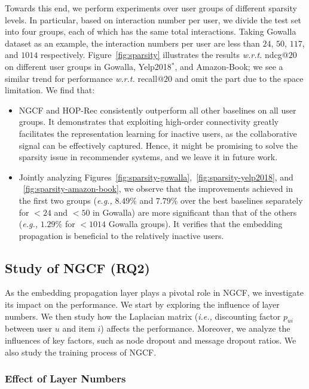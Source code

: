\documentclass[sigconf]{acmart}
\newcommand{\ie}{\emph{i.e., }}
\newcommand{\eg}{\emph{e.g., }}
\newcommand{\wrt}{\emph{w.r.t. }}
\theoremstyle{definition}
\begin{document}
Towards this end, we perform experiments over user groups of different sparsity levels.
In particular, based on interaction number per user, we divide the test set into four groups, each of which has the same total interactions.
Taking Gowalla dataset as an example, the interaction numbers per user are less than $24$, $50$, $117$, and $1014$ respectively.
Figure~\ref{fig:sparsity} illustrates the results \wrt ndcg@$20$ on different user groups in Gowalla, Yelp2018$^{*}$, and Amazon-Book; 
we see a similar trend for performance \wrt recall@$20$ and omit the part due to the space limitation.
We find that:
\begin{itemize}[leftmargin=*]
\item NGCF and HOP-Rec consistently outperform all other baselines on all user groups.
It demonstrates that exploiting high-order connectivity greatly facilitates the representation learning for inactive users, as the collaborative signal can be effectively captured.
Hence, it might be promising to solve the sparsity issue in recommender systems, and we leave it in future work.

\item Jointly analyzing Figures~\ref{fig:sparsity-gowalla},~\ref{fig:sparsity-yelp2018}, and ~\ref{fig:sparsity-amazon-book}, we observe that the improvements achieved in the first two groups (\eg $8.49\%$ and $7.79\%$ over the best baselines separately for $<24$ and $<50$ in Gowalla) are more significant than that of the others (\eg $1.29\%$ for $<1014$ Gowalla groups).
It verifies that the embedding propagation is beneficial to the relatively inactive users.
\end{itemize}


\subsection{Study of NGCF (RQ2)}
As the embedding propagation layer plays a pivotal role in NGCF, we investigate its impact on the performance.
We start by exploring the influence of layer numbers.
We then study how the Laplacian matrix (\ie discounting factor $p_{ui}$ between user $u$ and item $i$) affects the performance.
Moreover, we analyze the influences of key factors, such as node dropout and message dropout ratios.
We also study the training process of NGCF.

\subsubsection{\textbf{Effect of Layer Numbers}}
\end{document}

